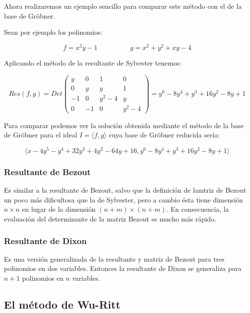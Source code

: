 Ahora realizaremos un ejemplo sencillo para comparar este método con el de la base de Gröbner.
\\
\par Sean por ejemplo los polinomios:

$$f = x^2 y - 1 \hspace{2cm} g = x^2 + y^2 + xy - 4$$

Aplicando el método de la resultante de Sylvester tenemos:

$$Res(f,g) = Det \begin{pmatrix}
y & 0 & 1 & 0 \\
0 & y & y & 1 \\
-1 & 0 & y^2 - 4 & y \\
0 & -1 & 0 & y^2 - 4
\end{pmatrix} = y^6 - 8y^4 + y^3 + 16y^2 - 8y + 1$$

Para comparar podemos ver la solución obtenida mediante el método de la base de Gröbner para el ideal $I = \langle f,g \rangle$ cuya base de Gröbner reducida sería:

$$\langle x - 4y^5- y^4 + 32y^3 + 4y^2 - 64y + 16 , y^6 - 8y^4 + y^3 + 16y^2 - 8y + 1 \rangle$$

\subsubsection*{Resultante de Bezout}

Es similar a la resultante de Bezout, salvo que la definición de lamtriz de Bezout un poco más dificultosa  que la de Sylvester, pero a cambio ésta tiene dimensión $n \times n$ en lugar de la dimensión $(n+m) \times (n+m)$. En consecuencia, la evaluación del determinante de la matriz Bezout es mucho más rápido.

\subsubsection*{Resultante de Dixon}

Es una versión generalizada de la resultante y matriz de Bezout para tres polinomios en dos variables. Entonces la resultante de Dixon se generaliza para $n+1$ polinomios en $n$ variables.

\subsection{El método de Wu-Ritt}

